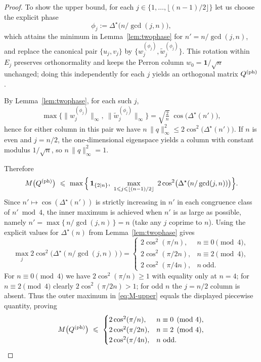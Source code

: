 \documentclass[12pt,fleqn]{amsart}
\renewcommand{\le}{\leqslant}
\renewcommand{\ge}{\geqslant}
\theoremstyle{remark}
\newcommand{\1}{\mathbf{1}}
\begin{document}
\begin{proof}
To show the upper bound, for each $j\in\{1,\dots,\lfloor (n-1)/2\rfloor\}$ let us choose the explicit phase
\[
\phi_j:=\Delta^\star\!\bigl(n/\gcd(j,n)\bigr),
\]
which attains the minimum in Lemma~\ref{lem:twophase} for $n'=n/\gcd(j,n)$, and replace the canonical pair $\{u_j,v_j\}$ by $\{w_j^{(\phi_j)},\tilde w_j^{(\phi_j)}\}$. This rotation within $E_j$ preserves orthonormality and keeps the Perron column $w_0=\1/\sqrt n$ unchanged; doing this independently for each $j$ yields an orthogonal matrix $Q^{\rm (ph)}$.

By Lemma~\ref{lem:twophase}, for each such $j$,
\[
\max\big\{\|w_j^{(\phi_j)}\|_\infty,\ \|\tilde w_j^{(\phi_j)}\|_\infty\big\}
=\sqrt{\tfrac{2}{n}}\;\cos\!\big(\Delta^\star(n')\big),
\]
hence for either column in this pair we have
\(
n\,\|q\|_\infty^2\le 2\cos^2\!\big(\Delta^\star(n')\big).
\)
If $n$ is even and $j=n/2$, the one-dimensional eigenspace yields a column with constant modulus $1/\sqrt n$, so $n\,\|q\|_\infty^2=1$.

Therefore
\begin{equation}\label{eq:M-upper}
M\big(Q^{\rm (ph)}\big)\ \le\ \max\Big\{\,\mathbf{1}_{\{2\mid n\}},\ \max_{1\le j\le \lfloor (n-1)/2\rfloor}\ 2\cos^2\!\big(\Delta^\star(n/\gcd(j,n))\big)\Big\}.
\end{equation}
Since $n'\mapsto \cos(\Delta^\star(n'))$ is strictly increasing in $n'$ in each congruence class of $n'\bmod 4$, the inner maximum is achieved when $n'$ is as large as possible, namely $n'=\max\{\,n/\gcd(j,n)\,\}=n$ (take any $j$ coprime to $n$). Using the explicit values for $\Delta^\star(n)$ from Lemma~\ref{lem:twophase} gives
\[
\max_{j}2\cos^2\!\big(\Delta^\star(n/\gcd(j,n))\big)
=
\begin{cases}
2\cos^2(\pi/n), & n\equiv 0\pmod 4,\\[1mm]
2\cos^2(\pi/2n), & n\equiv 2\pmod 4,\\[1mm]
2\cos^2(\pi/4n), & n\ \text{odd}.
\end{cases}
\]
For $n\equiv 0\pmod 4$ we have $2\cos^2(\pi/n)\ge 1$ with equality only at $n=4$; for $n\equiv 2\pmod 4$ clearly $2\cos^2(\pi/2n)>1$; for odd $n$ the $j=n/2$ column is absent. Thus the outer maximum in \eqref{eq:M-upper} equals the displayed piecewise quantity, proving
\[
M\big(Q^{\rm (ph)}\big)\ \le\
\begin{cases}
2\cos^2(\pi/n), & n\equiv 0\pmod 4,\\
2\cos^2(\pi/2n), & n\equiv 2\pmod 4,\\
2\cos^2(\pi/4n), & n\ \text{odd}.
\end{cases}
\]


\end{proof}
\end{document}
